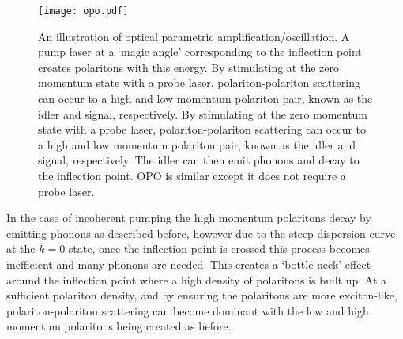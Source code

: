 \documentclass[letterpaper, 10 pt, conference]{IEEEtran}  %
\begin{document}
\begin{figure}[htbp!]
	\centering
	\texttt{[image: opo.pdf]}
	\caption{An illustration of optical parametric amplification/oscillation. A pump laser at a `magic angle' corresponding to the inflection point creates polaritons with this energy. 
	By stimulating at the zero momentum state with a probe laser, polariton-polariton scattering can occur to a high and low momentum polariton pair, known as the idler and signal, respectively. 
By stimulating at the zero momentum state with a probe laser, polariton-polariton scattering can occur to a high and low momentum polariton pair, known as the idler and signal, respectively.
The idler can then emit phonons and decay to the inflection point.
	OPO is similar except it does not require a probe laser. \cite{doi:10.1080/00107514.2010.550120}}
	\label{fig:opo}
\end{figure}
In the case of incoherent pumping the high momentum polaritons decay by emitting phonons as described before, however due to the steep dispersion curve at the $k=0$ state, once the inflection point is crossed this process becomes inefficient and many phonons are needed. 
This creates a `bottle-neck' effect around the inflection point where a high density of polaritons is built up. 
At a sufficient polariton density, and by ensuring the polaritons are more exciton-like, polariton-polariton scattering can become dominant with the low and high momentum polaritons being created as before. 
\end{document}
